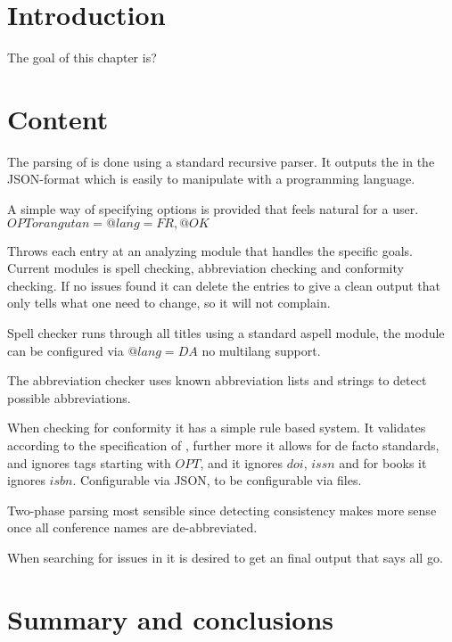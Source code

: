 \section{Introduction}
The goal of this chapter is?

\section{Content}

The parsing of {\bibtex} is done using a standard recursive parser.
It outputs the {\bibtex} in the JSON-format which is easily to
manipulate with a programming language.

A simple way of specifying options is provided that feels natural for
a {\bibtex} user.  $OPTorangutan = {@lang=FR, @OK}$

Throws each entry at an analyzing module that handles the specific
goals.  Current modules is spell checking, abbreviation checking and
conformity checking.  If no issues found it can delete the entries to give a
clean output that only tells what one need to change, so it will not
complain.

Spell checker runs through all titles using a standard aspell module,
the module can be configured via $@lang=DA$ no multilang support.

The abbreviation checker uses known abbreviation lists and strings to
detect possible abbreviations.

When checking for conformity it has a simple rule based system.  It
validates according to the specification of {\bibtex}, further more it
allows for de facto standards, and ignores tags starting with $OPT$,
and it ignores $doi$, $issn$ and for books it ignores $isbn$.
Configurable via JSON, to be configurable via {\bibtex} files.

Two-phase parsing most sensible since detecting consistency makes more
sense once all conference names are de-abbreviated.


When searching for issues in {\bibtex} it is desired to get an final
output that says all go.


\section{Summary and conclusions}